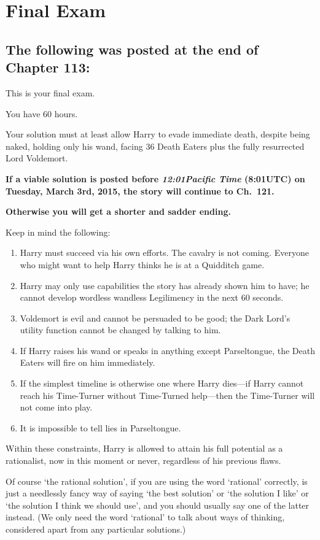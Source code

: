 \chapter{Final Exam}

\section{The following was posted at the end of Chapter 113:}

{%
\setlength{\parindent}{0pt}
\setlength{\parskip}{.5\baselineskip}

This is your final exam.

You have 60 hours.

Your solution must at least allow Harry to evade immediate death, despite being naked, holding only his wand, facing 36 Death Eaters plus the fully resurrected Lord Voldemort.

\textbf{If a viable solution is posted before \emph{12:01\am Pacific Time} (8:01\am UTC) on Tuesday, March 3rd, 2015, the story will continue to Ch.~121.}

\textbf{Otherwise you will get a shorter and sadder ending.}

Keep in mind the following:
\begin{enumerate}
\item Harry must succeed via his own efforts. The cavalry is not coming. Everyone who might want to help Harry thinks he is at a Quidditch game.
\item Harry may only use capabilities the story has already shown him to have; he cannot develop wordless wandless Legilimency in the next 60 seconds.
\item Voldemort is evil and cannot be persuaded to be good; the Dark Lord's utility function cannot be changed by talking to him.
\item If Harry raises his wand or speaks in anything except Parseltongue, the Death Eaters will fire on him immediately.
\item If the simplest timeline is otherwise one where Harry dies---if Harry cannot reach his Time-Turner without Time-Turned help---then the Time-Turner will not come into play.
\item It is impossible to tell lies in Parseltongue.
\end{enumerate}
Within these constraints, Harry is allowed to attain his full potential as a rationalist, now in this moment or never, regardless of his previous flaws.

Of course `the rational solution', if you are using the word `rational' correctly, is just a needlessly fancy way of saying `the best solution' or `the solution I like' or `the solution I think we should use', and you should usually say one of the latter instead. (We only need the word `rational' to talk about ways of thinking, considered apart from any particular solutions.)

}
